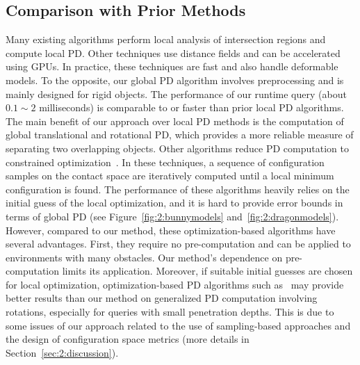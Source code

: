\subsection{Comparison with Prior Methods}
Many existing algorithms perform local analysis of intersection regions and
compute local PD. Other techniques use distance fields and can be accelerated using GPUs. In practice, these techniques are fast and also handle
deformable models. To the opposite, our global PD algorithm involves preprocessing and is mainly designed for rigid objects.
The performance of our runtime query (about $0.1\sim2$ milliseconds) is comparable to or faster than prior local PD algorithms. The main benefit of our approach over local PD methods is the computation of global
translational and rotational PD, which provides a more reliable measure of separating two overlapping objects.
Other algorithms reduce PD computation to constrained optimization~\cite{Nawratil:2009:GPD,Zhang:2007:AFP,Je:2012:PRP,Tang:IGP:2013}.
In these techniques, a sequence of configuration samples on the contact space are iteratively
computed until a local minimum configuration is found. The
performance of these algorithms heavily relies on the initial guess of the local optimization, and it is hard to provide
error bounds in terms of global PD (see Figure~\ref{fig:2:bunnymodels} and~\ref{fig:2:dragonmodels}). 
However, compared to our method, these optimization-based algorithms have several advantages. First, they require no pre-computation and can be applied to environments with many obstacles. Our method's dependence on pre-computation limits its application.
Moreover, if suitable initial guesses are chosen for local optimization, optimization-based PD algorithms such as~\cite{Tang:IGP:2013} may provide better results than our method on generalized PD computation involving rotations, especially for queries with small penetration depths.
This is due to some issues of our approach related to the use of sampling-based approaches and the design of configuration space metrics (more details in Section~\ref{sec:2:discussion}).


